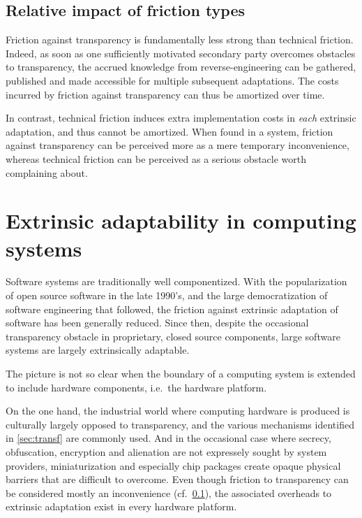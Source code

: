 \documentclass[a4paper]{article}
\newcommand{\ie}{i.e.~}
\newcommand{\cf}{cf.~}
\begin{document}
\subsection{Relative impact of friction types}\label{sec:ftypes}

Friction against transparency is fundamentally less strong than
technical friction. Indeed, as soon as one sufficiently motivated
secondary party overcomes obstacles to transparency, the accrued
knowledge from reverse-engineering can be gathered, published and made
accessible for multiple subsequent adaptations. The costs incurred by
friction against transparency can thus be amortized over time.

In contrast, technical friction induces extra implementation costs in
\emph{each} extrinsic adaptation, and thus cannot be amortized. When found in
a system, friction against transparency can be perceived more as a mere temporary
inconvenience, whereas technical friction can be perceived as a
serious obstacle worth complaining about.

\section{Extrinsic adaptability in computing systems}\label{sec:compsys}

Software systems are traditionally well componentized. With the
popularization of open source software in the late 1990's, and the
large democratization of software engineering that followed, the friction
against extrinsic adaptation of software has been generally
reduced. Since then, despite the occasional transparency obstacle in
proprietary, closed source components, large software systems are
largely extrinsically adaptable.

The picture is not so clear when the boundary of a computing system is
extended to include hardware components, \ie the hardware
platform.

On the one hand, the industrial world where computing hardware is
produced is culturally largely opposed to transparency, and the
various mechanisms identified in \cref{sec:transf} are commonly
used. And in the occasional case where secrecy, obfuscation,
encryption and alienation are not expressely sought by system
providers, miniaturization and especially chip packages create opaque
physical barriers that are difficult to overcome. Even though friction
to transparency can be considered mostly an inconvenience (\cf \cref{sec:ftypes}), the associated overheads to extrinsic adaptation
exist in every hardware platform.
\end{document}
